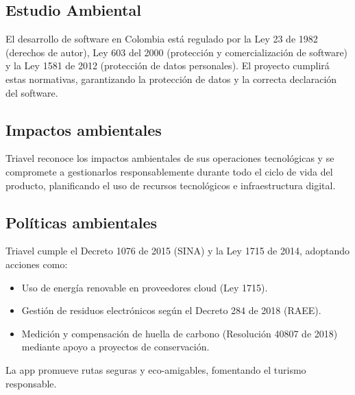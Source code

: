\subsection{Estudio Ambiental}

El desarrollo de software en Colombia está regulado por la Ley 23 de 1982 (derechos de autor), Ley 603 del 2000 (protección y comercialización de software) y la Ley 1581 de 2012 (protección de datos personales). El proyecto cumplirá estas normativas, garantizando la protección de datos y la correcta declaración del software.

\subsection*{Impactos ambientales}

Triavel reconoce los impactos ambientales de sus operaciones tecnológicas y se compromete a gestionarlos responsablemente durante todo el ciclo de vida del producto, planificando el uso de recursos tecnológicos e infraestructura digital.

\subsection*{Políticas ambientales}

Triavel cumple el Decreto 1076 de 2015 (SINA) y la Ley 1715 de 2014, adoptando acciones como:
\begin{itemize}
    \item Uso de energía renovable en proveedores cloud (Ley 1715).
    \item Gestión de residuos electrónicos según el Decreto 284 de 2018 (RAEE).
    \item Medición y compensación de huella de carbono (Resolución 40807 de 2018) mediante apoyo a proyectos de conservación.
\end{itemize}
La app promueve rutas seguras y eco-amigables, fomentando el turismo responsable.
